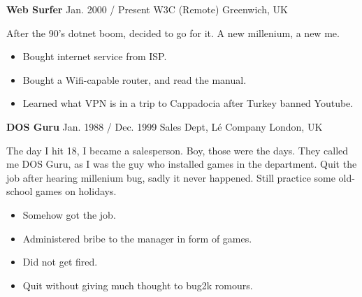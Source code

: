 

    
        \cvItemDoc
        {\large \textbf{Web Surfer}}
    	{Jan. 2000 / Present}
    	{W3C}
    	{(Remote) Greenwich, UK}
    	{
    	     After the 90's dotnet boom, decided to go for it. A new millenium, a new me.
                \begin{itemize}
        	        \setlength\itemsep{0em}
                    \item Bought internet service from ISP.
                    \item Bought a Wifi-capable router, and read the manual.
                    \item Learned what VPN is in a trip to Cappadocia after Turkey banned Youtube.
                \end{itemize}
        }
        
        \cvItemDoc
    	{\large \textbf{DOS Guru}}
        {Jan. 1988 / Dec. 1999}
        {Sales Dept, L\'{e} Company}
        {London, UK}
        {
            The day I hit 18, I became a salesperson. Boy, those were the days. They called me DOS Guru, as I was the guy who installed games in the department. Quit the job after hearing millenium bug, sadly it never happened. Still practice some old-school games on holidays.
            \par
                \begin{itemize}
        	        \setlength\itemsep{0em}
                    \item Somehow got the job.
                    \item Administered bribe to the manager in form of games.
                    \item Did not get fired.
                    \item Quit without giving much thought to bug2k romours.
                \end{itemize}
    	}
        
